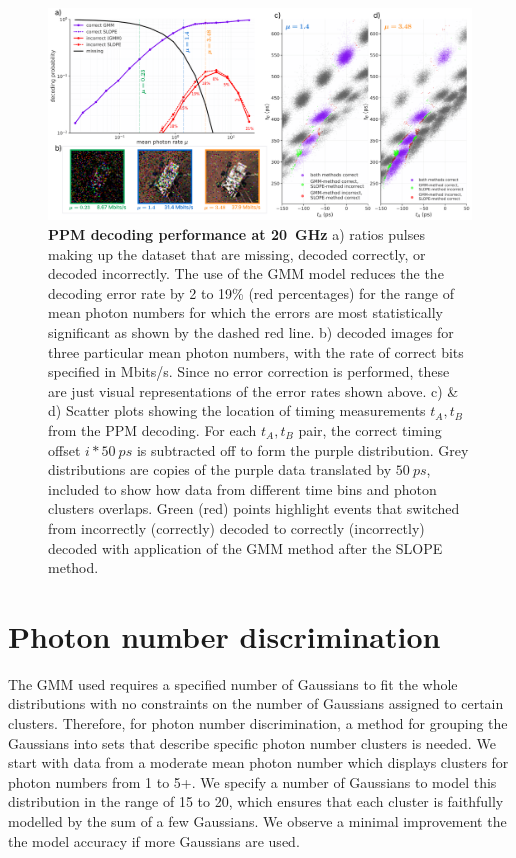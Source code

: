 \documentclass[11pt]{caltech_thesis} %
\begin{document}
\hypertarget{fig:decoding_20GHz}{%
\begin{figure}
\centering
\includegraphics[width=1\textwidth,height=\textheight]{./chapter_04/figs/ppm_decoding_20GHz_light.pdf}
\caption[{PPM decoding performance at 20~GHz}]{\textbf{PPM decoding performance at 20~GHz} a) ratios pulses making up the dataset that are missing, decoded correctly, or decoded incorrectly. The use of the GMM model reduces the the decoding error rate by 2 to 19\% (red percentages) for the range of mean photon numbers for which the errors are most statistically significant as shown by the dashed red line. b) decoded images for three particular mean photon numbers, with the rate of correct bits specified in Mbits/s. Since no error correction is performed, these are just visual representations of the error rates shown above. c) \& d) Scatter plots showing the location of timing measurements $t_A, t_B$ from the PPM decoding. For each $t_A,t_B$ pair, the correct timing offset $i*50~ps$ is subtracted off to form the purple distribution. Grey distributions are copies of the purple data translated by $50~ps$, included to show how data from different time bins and photon clusters overlaps. Green (red) points highlight events that switched from incorrectly (correctly) decoded to correctly (incorrectly) decoded with application of the GMM method after the SLOPE method.}
\label{fig:decoding_20GHz}
\end{figure}
}

\hypertarget{photon-number-discrimination}{%
\section{Photon number discrimination}\label{photon-number-discrimination}}

The GMM used requires a specified number of Gaussians to fit the whole distributions with no constraints on the number of Gaussians assigned to certain clusters. Therefore, for photon number discrimination, a method for grouping the Gaussians into sets that describe specific photon number clusters is needed. We start with data from a moderate mean photon number which displays clusters for photon numbers from 1 to 5+. We specify a number of Gaussians to model this distribution in the range of 15 to 20, which ensures that each cluster is faithfully modelled by the sum of a few Gaussians. We observe a minimal improvement the the model accuracy if more Gaussians are used.
\end{document}

